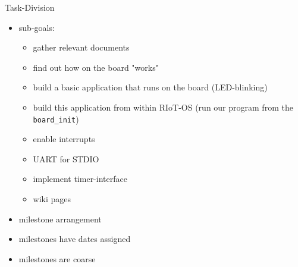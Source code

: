 \documentclass[9pt]{beamer}
\begin{document}
\begin{frame}{Task-Division}
 \begin{itemize}
 \item sub-goals:
 \begin{itemize}
 \item gather relevant documents
 \item find out how on the board "works"
 \item build a basic application that runs on the board (LED-blinking)
 \item build this application from within RIoT-OS (run our program from the \texttt{board\_init})
 \item enable interrupts
 \item UART for STDIO
 \item implement timer-interface
 \item wiki pages
 \end{itemize}
 \item milestone arrangement
 \item milestones have dates assigned
 \item milestones are coarse
 \end{itemize}
\end{frame}
\end{document}
